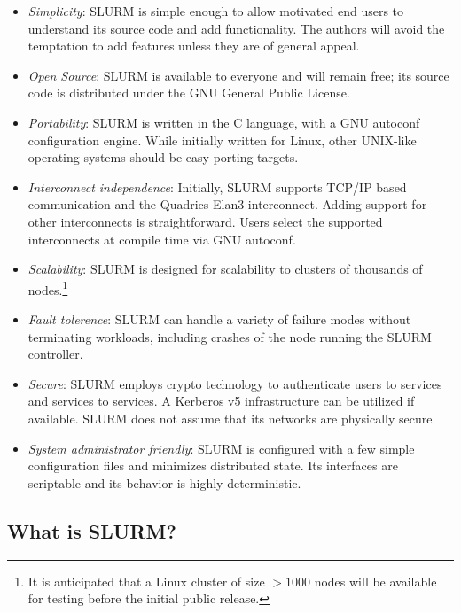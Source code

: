 \begin{itemize}
\item {\em Simplicity}: SLURM is simple enough to allow motivated end users
to understand its source code and add functionality.  The authors will 
avoid the temptation to add features unless they are of general appeal.

\item {\em Open Source}: SLURM is available to everyone and will remain free;
its source code is distributed under the GNU General Public License.

\item {\em Portability}: SLURM is written in the C language, with a GNU 
autoconf configuration engine.  While initially written for Linux, 
other UNIX-like operating systems should be easy porting targets.

\item {\em Interconnect independence}: Initially, SLURM supports TCP/IP based
communication and the Quadrics Elan3 interconnect.  Adding support for other
interconnects is straightforward.  Users select the supported interconnects
at compile time via GNU autoconf.

\item {\em Scalability}: SLURM is designed for scalability to clusters of
thousands of nodes.\footnote{It is anticipated that a Linux cluster of
size $>1000$ nodes will be available for testing before the initial public 
release.}

\item {\em Fault tolerence}: SLURM can handle a variety of failure modes
without terminating workloads, including crashes of the node running the SLURM
controller.

\item {\em Secure}: SLURM employs crypto technology to authenticate 
users to services and services to services.  
A Kerberos v5 infrastructure can be utilized if available.
SLURM does not assume that its networks are physically secure.

\item {\em System administrator friendly}: SLURM is configured with a few
simple configuration files and minimizes distributed state.  Its interfaces
are scriptable and its behavior is highly deterministic.

\end{itemize}

\subsection{What is SLURM?}

